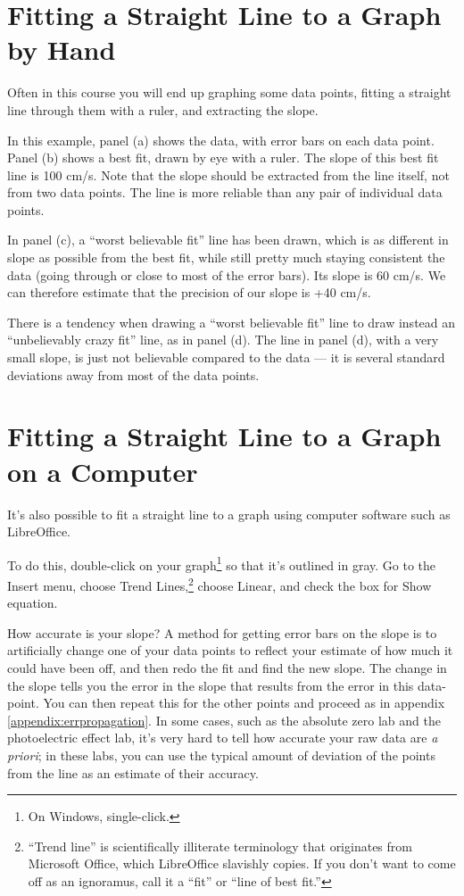 \section*{Fitting a Straight Line to a Graph by Hand}

Often in this course you will end up graphing some data
points, fitting a straight line through them with a ruler,
and extracting the slope.


In this example, panel (a) shows the data, with error bars
on each data point. Panel (b) shows a best fit, drawn by eye
with a ruler. The slope of this best fit line is 100 cm/s.
Note that the slope should be extracted from the line
itself, not from two data points. The line is more reliable
than any pair of individual data points.

In panel (c), a ``worst believable fit'' line has been
drawn, which is as different in slope as possible from the
best fit, while still pretty much staying consistent the
data (going through or close to most of the error bars). Its
slope is 60 cm/s. We can therefore estimate that the
precision of our slope is +40 cm/s.

There is a tendency when drawing a ``worst believable fit''
line to draw instead an ``unbelievably crazy fit'' line, as
in panel (d). The line in panel (d), with a very small
slope, is just not believable compared to the data --- it is
several standard deviations away from most of the data points.

\section*{Fitting a Straight Line to a Graph on a Computer}
It's also possible to fit a straight line to a graph using computer
software such as LibreOffice. 

To do this, double-click on your graph\footnote{On Windows, single-click.} so that it's outlined in gray.
Go to the Insert menu, choose
Trend Lines,\footnote{``Trend line'' is scientifically illiterate terminology
that originates from Microsoft Office, which LibreOffice slavishly copies. If you
don't want to come off as an ignoramus, call it a ``fit'' or ``line of best fit.''
} choose Linear, and check the box for Show equation.

How accurate is your slope? A method for getting error bars on the slope
is to artificially change one of your data
points to reflect your estimate of how much it could have been off,
and then redo the fit and find the new slope. The change in the slope
tells you the error in the slope that results from the error in this
data-point. You can then repeat this for the other points and
proceed as in appendix \ref{appendix:errpropagation}. In some cases, such as the absolute zero
lab and the photoelectric effect lab, it's very hard to tell how accurate
your raw data are \emph{a priori}; in these labs, you can use the typical
amount of deviation of the points from the line as an estimate of their
accuracy.
